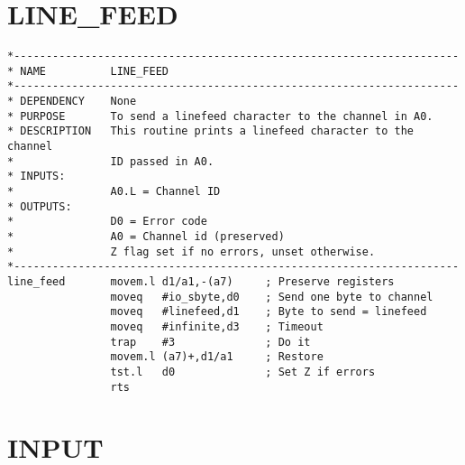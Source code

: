 \section{LINE\_FEED}
\label{ch9-LINE_FEED}%

\begin{lstlisting}[firstnumber=1,caption={LINE\_FEED}]
*---------------------------------------------------------------------
* NAME          LINE_FEED
*---------------------------------------------------------------------
* DEPENDENCY    None
* PURPOSE       To send a linefeed character to the channel in A0.
* DESCRIPTION   This routine prints a linefeed character to the channel
*               ID passed in A0.
* INPUTS:
*               A0.L = Channel ID
* OUTPUTS:
*               D0 = Error code
*               A0 = Channel id (preserved)
*               Z flag set if no errors, unset otherwise.
*---------------------------------------------------------------------
line_feed       movem.l d1/a1,-(a7)     ; Preserve registers 
                moveq   #io_sbyte,d0    ; Send one byte to channel
                moveq   #linefeed,d1    ; Byte to send = linefeed
                moveq   #infinite,d3    ; Timeout
                trap    #3              ; Do it
                movem.l (a7)+,d1/a1     ; Restore
                tst.l   d0              ; Set Z if errors
                rts
\end{lstlisting}

\section{INPUT}
\label{ch9-INPUT}%

